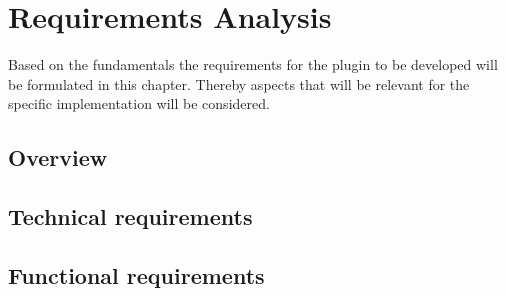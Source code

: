 \acresetall

\chapter{Requirements Analysis}\label{chapter:requirements-analysis}
Based on the fundamentals the requirements for the plugin to be developed will be formulated in this chapter.
Thereby aspects that will be relevant for the specific implementation will be considered.

\section{Overview}
\doit



\section{Technical requirements}
\doit


\section{Functional requirements}
\doit

